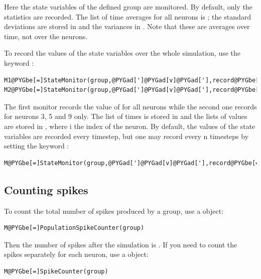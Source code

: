 \documentclass[letterpaper,10pt]{manual}
\begin{document}
Here the state variables  of the defined group are monitored. By default, only the statistics
are recorded. The list of time averages for all neurons is ; the standard deviations are stored
in  and the variances in . Note that these are averages over time, not over the neurons.

To record the values of the state variables over the whole simulation, use the keyword :

\begin{Verbatim}[commandchars=@\[\]]
M1@PYGbe[=]StateMonitor(group,@PYGad[']@PYGad[v]@PYGad['],record@PYGbe[=]@PYGaA[True])
M2@PYGbe[=]StateMonitor(group,@PYGad[']@PYGad[v]@PYGad['],record@PYGbe[=]@lb[]@PYGaw[3],@PYGaw[5],@PYGaw[9]@rb[])
\end{Verbatim}

The first monitor records the value of  for all neurons while the second one records  for
neurons 3, 5 and 9 only. The list of times is stored in  and the lists of values are stored in
, where i the index of the neuron.
By default, the values of the state variables are recorded every timestep, but one may record every n timesteps
by setting the keyword :

\begin{Verbatim}[commandchars=@\[\]]
M@PYGbe[=]StateMonitor(group,@PYGad[']@PYGad[v]@PYGad['],record@PYGbe[=]@PYGaA[True],timestep@PYGbe[=]n)
\end{Verbatim}


\subsection{Counting spikes}

To count the total number of spikes produced by a group, use a \hyperlink{brian.PopulationSpikeCounter}{} object:

\begin{Verbatim}[commandchars=@\[\]]
M@PYGbe[=]PopulationSpikeCounter(group)
\end{Verbatim}

Then the number of spikes after the simulation is . If you need to count the spikes
separately for each neuron, use a \hyperlink{brian.SpikeCounter}{} object:

\begin{Verbatim}[commandchars=@\[\]]
M@PYGbe[=]SpikeCounter(group)
\end{Verbatim}
\end{document}
